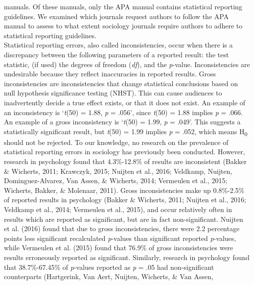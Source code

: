 \documentclass[
  12pt,
]{article}
\begin{document}
manuals. Of these manuals, only the APA manual contains statistical
reporting guidelines. We examined which journals request authors to
follow the APA manual to assess to what extent sociology journals
require authors to adhere to statistical reporting guidelines.\\
\hspace*{0.333em}\hspace*{0.333em}\hspace*{0.333em}\hspace*{0.333em}Statistical
reporting errors, also called inconsistencies, occur when there is a
discrepancy between the following parameters of a reported result: the
test statistic, (if used) the degrees of freedom (\emph{df}), and the
\emph{p}-value. Inconsistencies are undesirable because they reflect
inaccuracies in reported results. Gross inconsistencies are
inconsistencies that change statistical conclusions based on null
hypothesis significance testing (NHST). This can cause audiences to
inadvertently decide a true effect exists, or that it does not exist. An
example of an inconsistency is `\emph{t}(50) = 1.88, \emph{p} = .056',
since \emph{t}(50) = 1.88 implies \emph{p} = .066. An example of a gross
inconsistency is `\emph{t}(50) = 1.99, \emph{p} = .049'. This suggests a
statistically significant result, but \emph{t}(50) = 1.99 implies
\emph{p} = .052, which means H\textsubscript{0} should not be rejected.
To our knowledge, no research on the prevalence of statistical reporting
errors in sociology has previously been conducted. However, research in
psychology found that 4.3\%-12.8\% of results are inconsistent (Bakker
\& Wicherts, 2011; Krawczyk, 2015; Nuijten et al., 2016; Veldkamp,
Nuijten, Dominguez-Alvarez, Van Assen, \& Wicherts, 2014; Vermeulen et
al., 2015; Wicherts, Bakker, \& Molenaar, 2011). Gross inconsistencies
make up 0.8\%-2.5\% of reported results in psychology (Bakker \&
Wicherts, 2011; Nuijten et al., 2016; Veldkamp et al., 2014; Vermeulen
et al., 2015), and occur relatively often in results which are reported
as significant, but are in fact non-significant. Nuijten et al. (2016)
found that due to gross inconsistencies, there were 2.2 percentage
points less significant recalculated \emph{p}-values than significant
reported \emph{p}-values, while Vermeulen et al. (2015) found that
76.9\% of gross inconsistencies were results erroneously reported as
significant. Similarly, research in psychology found that 38.7\%-67.45\%
of \emph{p}-values reported as \emph{p} = .05 had non-significant
counterparts (Hartgerink, Van Aert, Nuijten, Wicherts, \& Van Assen,
\end{document}
